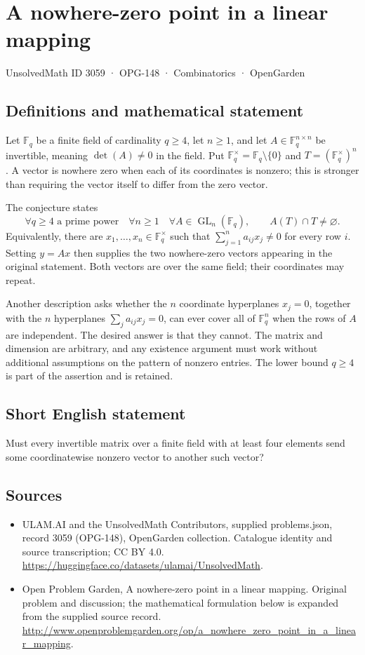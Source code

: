 \documentclass[11pt,a4paper]{article}
\begin{document}
\section*{A nowhere-zero point in a linear mapping}\label{3059}
{\small UnsolvedMath ID 3059 · OPG-148 · Combinatorics · OpenGarden}
\subsection{Definitions and mathematical statement}
Let $\mathbb F_q$ be a finite field of cardinality $q\ge4$, let $n\ge1$,
and let $A\in\mathbb F_q^{n\times n}$ be invertible, meaning
$\det(A)\ne0$ in the field. Put
$\mathbb F_q^\times=\mathbb F_q\setminus\{0\}$ and
$T=(\mathbb F_q^\times)^n$.
A vector is nowhere zero when each of its coordinates is nonzero; this
is stronger than requiring the vector itself to differ from the zero vector.

The conjecture states
\[
 \forall q\ge4\text{ a prime power}\quad\forall n\ge1\quad
 \forall A\in\operatorname{GL}_n(\mathbb F_q),\qquad
 A(T)\cap T\ne\varnothing.
\]
Equivalently, there are $x_1,\ldots,x_n\in\mathbb F_q^\times$ such that
$\sum_{j=1}^n a_{ij}x_j\ne0$ for every row $i$. Setting $y=Ax$ then
supplies the two nowhere-zero vectors appearing in the original statement.
Both vectors are over the same field; their coordinates may repeat.

Another description asks whether the $n$ coordinate hyperplanes
$x_j=0$, together with the $n$ hyperplanes
$\sum_j a_{ij}x_j=0$, can ever cover all of $\mathbb F_q^n$ when the rows
of $A$ are independent. The desired answer is that they cannot.
The matrix and dimension are arbitrary, and any existence argument must
work without additional assumptions on the pattern of nonzero entries.
The lower bound $q\ge4$ is part of the assertion and is retained.
\subsection{Short English statement}
Must every invertible matrix over a finite field with at least four elements send some coordinatewise nonzero vector to another such vector?
\subsection{Sources}
\begin{itemize}
\item[S1] ULAM.AI and the UnsolvedMath Contributors, supplied problems.json, record 3059 (OPG-148), OpenGarden collection. Catalogue identity and source transcription; CC BY 4.0.
\url{https://huggingface.co/datasets/ulamai/UnsolvedMath}.
\item[S2] Open Problem Garden, A nowhere-zero point in a linear mapping. Original problem and discussion; the mathematical formulation below is expanded from the supplied source record.
\url{http://www.openproblemgarden.org/op/a_nowhere_zero_point_in_a_linear_mapping}.
\end{itemize}
\end{document}
